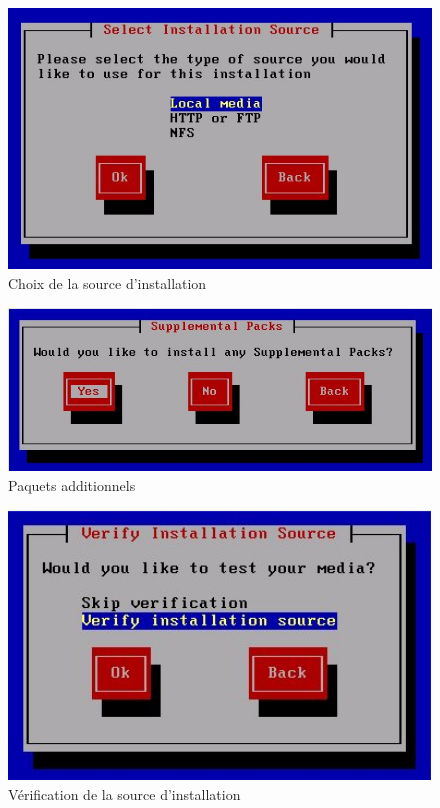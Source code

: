 \begin{figure}
\begin{center}
\includegraphics[width=350pt]{images/4.png}
\end{center}
\caption{Choix de la source d'installation}
\end{figure}
\begin{figure}
\begin{center}
\includegraphics[width=350pt]{images/5.png}
\end{center}
\caption{Paquets additionnels}
\end{figure}
\begin{figure}
\begin{center}
\includegraphics[width=350pt]{images/6.png}
\end{center}
\caption{Vérification de la source d'installation}
\end{figure}
